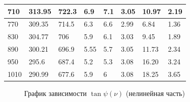 \documentclass[a4paper, 12pt]{article}
\begin{document}
\begin{table}[!ht]
\begin{tabular}{|l|l|l|l|l|l|l|l|}
			710 & 313.95 & 722.3 & 6.9 & 7.1 & 3.05 & 10.97 & 2.19 \\ \hline
			770 & 309.35 & 714.5 & 6.3 & 6.6 & 2.99 & 6.84 & 1.36 \\ \hline
			830 & 304.77 & 706 & 5.9 & 6.1 & 3.03 & 9.45 & 1.89 \\ \hline
			890 & 300.21 & 696.9 & 5.55 & 5.7 & 3.05 & 11.73 & 2.34 \\ \hline
			950 & 295.6 & 687.4 & 5.2 & 5.3 & 3.08 & 16.20 & 3.24 \\ \hline
			1010 & 290.99 & 677.6 & 5.9 & 6 & 3.08 & 18.25 & 3.65 \\ \hline
		\end{tabular}
	\end{table}
	\begin{figure}[h]
		\caption{График зависимости $\tan \psi (\nu)$ (нелинейная часть)}\label{fig:tg_psi_nu_no_line}
		\newpage
	\end{figure}
\newpage
\end{document}
